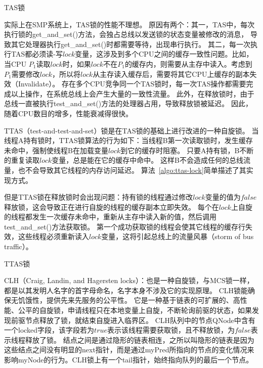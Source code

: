 \begin{algorithm}[htbp]
\caption{TAS锁}
\label{algo:tas-lock}
\end{algorithm}

实际上在SMP系统上，TAS锁的性能不理想。
原因有两个：其一，TAS中，每次执行锁的get\_and\_set()方法，会独占总线以发送锁的状态变量被修改的消息，
导致其它处理器执行get\_and\_set()时都需要等待，出现串行执行。
其二，每一次执行TAS都必须读-写$lock$变量，这涉及到多个CPU之间的缓存一致性问题。比如，当CPU $P_1$读取$lock$时，如果$lock$不在$P_1$的缓存内，则需要从主存中读入。考虑到$P_1$需要修改$lock$，所以将$lock$从主存读入缓存后，需要将其它CPU上缓存的副本失效（Invalidate）。
存在多个CPU竞争同一个TAS锁时，每一次TAS操作都需要完成以上操作，在系统总线上会产生大量的一致性流量。
此外，在释放锁时，由于总线一直被执行test\_and\_set()方法的处理器占用，导致释放锁被延迟。
因此，随着CPU数目的增多，性能衰减得很快。

TTAS（test-and-test-and-set）锁是在TAS锁的基础上进行改进的一种自旋锁。
当线程A持有锁时，TTAS锁算法的行为如下：当线程B第一次读取锁时，发生缓存未命中，强制使线程B在加载变量$lock$到它的缓存时阻塞。
只要A持有锁，B不断的重复读取$lock$变量，总是能在它的缓存中命中。
这样B不会造成任何的总线流量，也不会导致其它线程的内存访问延迟。
算法~\ref{algo:ttas-lock}简单描述了其实现方式。

但是TTAS锁在释放锁时会出现问题：持有锁的线程通过修改$lock$变量的值为$false$释放锁，这会导致正在进行自旋的线程的缓存副本立即失效。
每个在$lock$上自旋的线程都发生一次缓存未命中，重新从主存中读入新的值，然后调用test\_and\_set()方法获取锁。
第一个成功获取锁的线程会使其它线程的缓存行失效，这些线程必须重新读入$lock$变量，这将引起总线上的流量风暴（storm of bus traffic）。

\begin{algorithm}[htbp]
\caption{TTAS锁}
\label{algo:ttas-lock}
\end{algorithm}

CLH（Craig, Landin, and Hagersten locks）\cite{craig1993building, magnusson1994queue}：也是一种自旋锁，与MCS锁一样，都是以其发明人名字的首字母命名，名字本身不涉及它的实现原理。
CLH锁能确保无饥饿性，提供先来先服务的公平性。
它是一种基于链表的可扩展的、高性能、公平的自旋锁，申请线程只在本地变量上自旋，不断轮询前驱的状态，如果发现前驱节点释放了锁，就结束自旋进入临界区。
CLH队列中的节点QNode中含有一个locked字段，该字段若为$true$表示该线程需要获取锁，且不释放锁，为$false$表示线程释放了锁。
结点之间是通过隐形的链表相连，之所以叫隐形的链表是因为这些结点之间没有明显的next指针，而是通过myPred所指向的节点的变化情况来影响myNode的行为。CLH锁上有一个tail指针，始终指向队列的最后一个节点。

